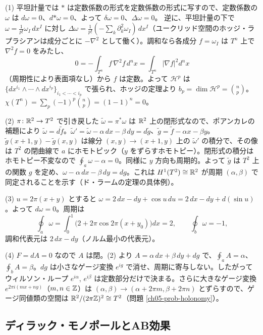 \begin{solution}
(1) 平坦計量では ${*}$ は定数係数の形式を定数係数の形式に写すので、定数係数の $\omega$ は $d\omega=0$、$d{*\omega}=0$、よって $\delta\omega=0$、$\Delta\omega=0$。
逆に、平坦計量の下で $\omega=\frac1{p!}\omega_I\,dx^I$ に対し $\Delta\omega=\frac1{p!}(-\sum_k\partial_k^2\omega_I)\,dx^I$（ユークリッド空間のホッジ・ラプラシアンは成分ごとに $-\nabla^2$ として働く）。調和なら各成分 $f=\omega_I$ は $T^n$ 上で $\nabla^2f=0$ をみたし、
\[
0=-\int_{T^n}f\,\nabla^2f\,d^nx=\int_{T^n}\lvert\nabla f\rvert^2d^nx
\]
（周期性により表面項なし）から $f$ は定数。よって $\mathcal H^p$ は $\{dx^{i_1}\wedge\cdots\wedge dx^{i_p}\}_{i_1<\cdots<i_p}$ で張られ、ホッジの定理より $b_p=\dim\mathcal H^p=\binom np$。$\chi(T^n)=\sum_p(-1)^p\binom np=(1-1)^n=0$。

(2) $\pi\colon\mathbb{R}^2\to T^2$ で引き戻した $\tilde\omega=\pi^*\omega$ は $\mathbb{R}^2$ 上の閉形式なので、ポアンカレの補題により $\tilde\omega=d\tilde f$。$\tilde\omega'=\tilde\omega-\alpha\,dx-\beta\,dy=d\tilde g$、$\tilde g=\tilde f-\alpha x-\beta y$。$\tilde g(x+1,y)-\tilde g(x,y)$ は線分 $(x,y)\to(x+1,y)$ 上の $\tilde\omega'$ の積分で、その像は $T^2$ の閉曲線で $a$ にホモトピック（$y$ をずらすホモトピー）。閉形式の積分はホモトピー不変なので $\oint_a\omega-\alpha=0$。同様に $y$ 方向も周期的。よって $\tilde g$ は $T^2$ 上の関数 $g$ を定め、$\omega-\alpha\,dx-\beta\,dy=dg$。これは $H^1(T^2)\cong\mathbb{R}^2$ が周期 $(\alpha,\beta)$ で同定されることを示す（ド・ラームの定理の具体例）。

(3) $u=2\pi(x+y)$ とすると $\omega=2\,dx-dy+\cos u\,du=2\,dx-dy+d(\sin u)$。よって $d\omega=0$。周期は
\[
\oint_a\omega=\int_0^1\bigl(2+2\pi\cos2\pi(x+y_0)\bigr)dx=2,\qquad\oint_b\omega=-1,
\]
調和代表元は $2\,dx-dy$（ノルム最小の代表元）。

(4) $F=dA=0$ なので $A$ は閉。(2) より $A=\alpha\,dx+\beta\,dy+dg$ で、$\oint_aA=\alpha$、$\oint_bA=\beta$。$dg$ は小さなゲージ変換 $e^{ig}$ で消せ、周期に寄与しない。したがってウィルソン・ループ $e^{i\alpha}$, $e^{i\beta}$ は定数部分だけで決まる。さらに大きなゲージ変換 $e^{2\pi i(mx+ny)}$（$m,n\in\mathbb{Z}$）は $(\alpha,\beta)\to(\alpha+2\pi m,\beta+2\pi n)$ とずらすので、ゲージ同値類の空間は $\mathbb{R}^2/(2\pi\mathbb{Z})^2\cong T^2$（問題 \ref{ch05-prob-holonomy}）。
\end{solution}

\subsection{ディラック・モノポールとAB効果}

